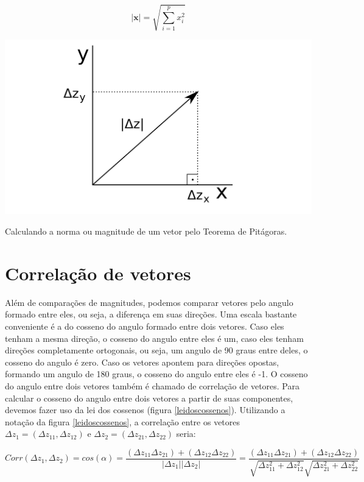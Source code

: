 \documentclass[portuges,]{tufte-handout}
\begin{document}
\[
|\mathbf{x}| = \sqrt{\sum_{i=1}^p x_i^2}
\]

\begin{marginfigure}
\includegraphics{./figuras/pitagoras.png}
\caption{Calculando a norma ou magnitude de um vetor pelo
Teorema de Pitágoras.}
\label{pitagoras}
\end{marginfigure}

\section{Correlação de vetores}\label{correlauxe7uxe3o-de-vetores}

Além de comparações de magnitudes, podemos comparar vetores pelo angulo
formado entre eles, ou seja, a diferença em suas direções. Uma escala
bastante conveniente é a do cosseno do angulo formado entre dois
vetores. Caso eles tenham a mesma direção, o cosseno do angulo entre
eles é um, caso eles tenham direções completamente ortogonais, ou seja,
um angulo de 90 graus entre deles, o cosseno do angulo é zero. Caso os
vetores apontem para direções opostas, formando um angulo de 180 graus,
o cosseno do angulo entre eles é -1. O cosseno do angulo entre dois
vetores também é chamado de correlação de vetores. Para calcular o
cosseno do angulo entre dois vetores a partir de suas componentes,
devemos fazer uso da lei dos cossenos (figura \ref{leidoscossenos}).
Utilizando a notação da figura \ref{leidoscossenos}, a correlação entre
os vetores \(\Delta z_1 = (\Delta z_{11}, \Delta z_{12})\) e
\(\Delta z_2 = (\Delta z_{21}, \Delta z_{22})\) seria:

\[
Corr(\Delta z_1, \Delta z_2) = cos(\alpha) = \frac{(\Delta z_{11}  \Delta z_{21}) + (\Delta z_{12}  \Delta z_{22})}{| \Delta z_1|  | \Delta z_2|} = \frac{(\Delta z_{11}  \Delta z_{21}) + (\Delta z_{12}  \Delta z_{22})}{\sqrt{\Delta z_{11}^2 + \Delta z_{12}^2}  \sqrt{\Delta z_{21}^2 + \Delta z_{22}^2}}
\]
\end{document}
